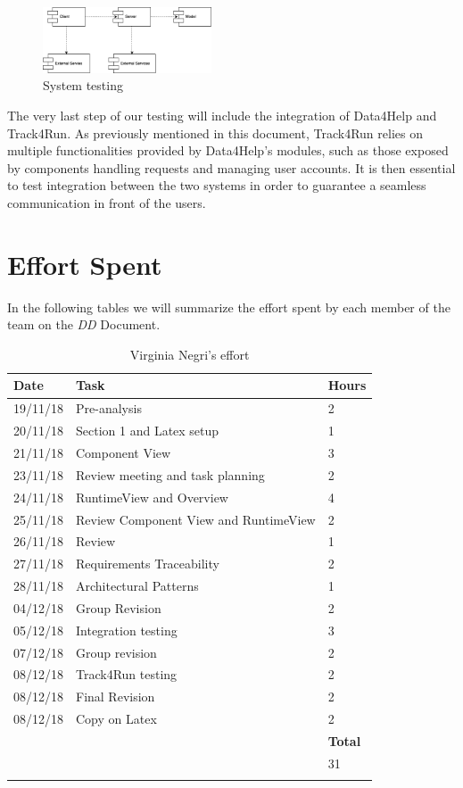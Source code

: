 \documentclass[titlepage]{article}
\begin{document}
\begin{figure}[H]
	\center
  	\includegraphics[width=5cm]{systemTesting.png}
  	\caption{System testing}
 	\label{fig:systemTesting}
\end{figure}
The very last step of our testing will include the integration of Data4Help and Track4Run. As previously mentioned in this document, Track4Run relies on multiple functionalities provided by Data4Help’s modules, such as those exposed by components handling requests and managing user accounts. It is then essential to test integration between the two systems in order to guarantee a seamless communication in front of the users.  
\pagebreak


\section{Effort Spent}

In the following tables we will summarize the effort spent by each member of the team on the {\it DD} Document.
		
		
	\begin{longtable}{| p{2 cm} | p{5 cm} | p{2 cm} |} 
			\hline
			{\bf Date} & {\bf Task} & {\bf Hours}\\
			\hline
			19/11/18 & Pre-analysis & 2 \\
			20/11/18 & Section 1 and Latex setup & 1\\
			21/11/18 & Component View & 3 \\
			23/11/18 & Review meeting and task planning & 2 \\
			24/11/18 & RuntimeView and Overview & 4 \\
			25/11/18 & Review Component View and RuntimeView & 2 \\
			26/11/18 & Review & 1 \\
			27/11/18 & Requirements Traceability & 2 \\
			28/11/18 & Architectural Patterns & 1 \\
			04/12/18 & Group Revision & 2\\
			05/12/18 & Integration testing & 3 \\
			07/12/18 & Group revision & 2 \\
			08/12/18 & Track4Run testing & 2 \\
			08/12/18 & Final Revision & 2 \\
			08/12/18 & Copy on Latex & 2 \\
			\hline
			& & {\bf Total} \\
			\hline
			& & 31 \\
			\hline
			\caption{Virginia Negri's effort}
		\end{longtable}
	
\end{document}
